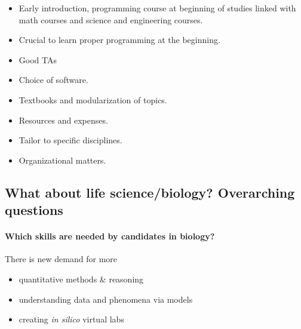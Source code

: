 \documentclass[%
twoside,                 %
final,                   %
10pt]{article}
\begin{document}
\begin{itemize}
\item Early introduction, programming course at beginning of studies linked with math courses and science and engineering courses.

\item Crucial to learn proper programming at the beginning.

\item Good TAs

\item Choice of software.

\item Textbooks and modularization of topics.

\item Resources and expenses.

\item Tailor to specific disciplines.

\item Organizational matters.
\end{itemize}

\noindent




\subsection*{What about life science/biology? Overarching questions}


\paragraph{Which skills are needed by candidates in biology?}
There is new demand for more

\begin{itemize}
  \item quantitative methods {\&} reasoning

  \item understanding data and phenomena via models

  \item creating \emph{in silico} virtual labs
\end{itemize}

\noindent




\end{document}
